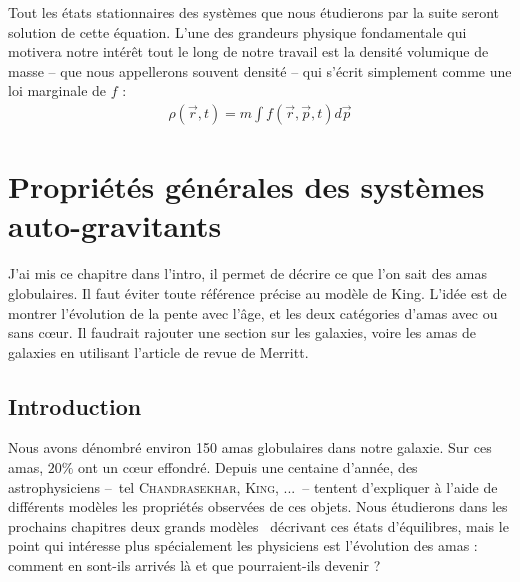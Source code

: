 	Tout les \'{e}tats stationnaires des syst\`{e}mes que nous \'{e}tudierons par la suite seront solution de cette \'{e}quation.
	L'une des grandeurs physique fondamentale qui motivera notre int\'{e}r\^{e}t tout le long de notre travail est la densit\'{e} volumique de masse -- que nous appellerons souvent densit\'{e} -- qui s'\'{e}crit simplement comme une loi marginale de $f$ :
	\begin{align}
		\rho(\vec{r},t) = m\int f(\vec{r},\vec{p},t) d\vec{p} \label{def-dens}
	\end{align}

\chapter{Propriétés générales des systèmes auto-gravitants}

J'ai mis ce chapitre dans l'intro, il permet de décrire ce que l'on sait des amas globulaires. Il faut éviter toute référence précise au modèle de King. L'idée est de montrer l'évolution de la pente avec l'âge, et les deux catégories d'amas avec ou sans c\oe ur.
 Il faudrait rajouter une section sur les galaxies, voire les amas de galaxies en utilisant l'article de revue de Merritt.

	\minitoc
	\section{Introduction}

	Nous avons dénombré environ 150 amas globulaires dans notre galaxie. Sur ces amas, $20\%$ ont un cœur effondré. %
	Depuis une centaine d'année, des astrophysiciens --~tel \textsc{Chandrasekhar}, \textsc{King}, ...~--
	tentent d'expliquer à l'aide de différents modèles les propriétés observées de ces objets.
	Nous étudierons dans les prochains chapitres deux \og grands modèles \fg~décrivant ces états d'équilibres,
	mais le point qui intéresse plus spécialement les physiciens est l'évolution des amas : comment en sont-ils
	arrivés là et que pourraient-ils devenir ?


